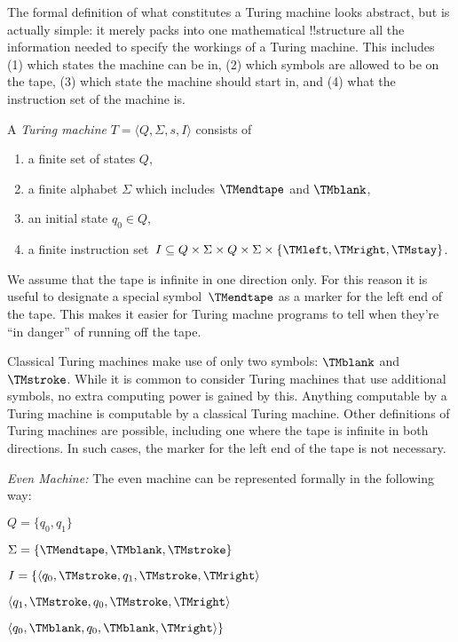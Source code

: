 \documentclass[../../../include/open-logic-section]{subfiles}
\begin{document}
\begin{explain}
The formal definition of what constitutes a Turing machine looks
abstract, but is actually simple: it merely packs into one
mathematical !!{structure} all the information needed to specify the
workings of a Turing machine. This includes (1) which states the
machine can be in, (2) which symbols are allowed to be on the tape, (3)
which state the machine should start in, and (4) what the instruction
set of the machine is.
\end{explain}

\begin{defn}
A \emph{Turing machine} $T = \langle Q, \Sigma, s, I\rangle$ consists of
\begin{enumerate}
\item a finite set of states $Q$,
\item a finite alphabet $\Sigma$ which includes $\TMendtape$ and
  $\TMblank$,
\item an initial state $q_0 \in Q$,
\item a finite instruction set~$I \subseteq Q \times \Sigma \times Q
  \times \Sigma \times \{\TMleft, \TMright, \TMstay\}$.
\end{enumerate}
\end{defn}

\begin{explain}
We assume that the tape is infinite in one direction only. For this
reason it is useful to designate a special symbol~$\TMendtape$ as
a marker for the left end of the tape. This makes it easier for
Turing machne programs to tell when they're ``in danger'' of running
off the tape. 

Classical Turing machines make use of only two symbols: $\TMblank$ and
$\TMstroke$. While it is common to consider Turing machines that use additional
symbols, no extra computing power is gained by this. Anything computable by
a Turing machine is computable by a classical Turing machine. Other
definitions of Turing machines are possible,
including one where the tape is infinite in both directions. In such cases,
the marker for the left end of the tape is not necessary.
\end{explain}

\begin{ex}
\emph{Even Machine:} The even machine can be represented formally
in the following way:

$Q =  \{ q_0, q_1 \}$

$\Sigma = \{ \TMendtape, \TMblank, \TMstroke \}$

$I = \{ \langle q_0, \TMstroke, q_1, \TMstroke, \TMright \rangle$

	  $\langle q_1, \TMstroke, q_0, \TMstroke, \TMright \rangle$
	  
	  $\langle q_0, \TMblank, q_0, \TMblank, \TMright \rangle \}$

\end{ex}
\end{document}

